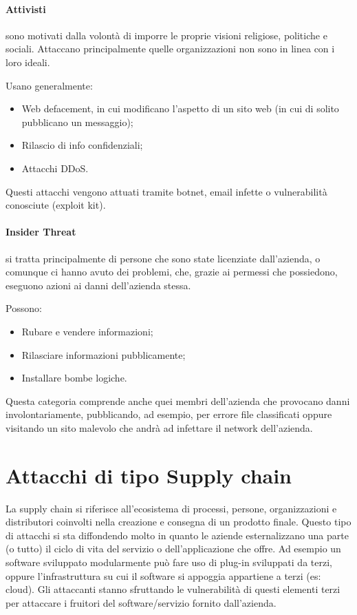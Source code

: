 \paragraph{Attivisti} sono motivati dalla volontà di imporre le proprie visioni religiose, politiche e sociali. Attaccano principalmente quelle organizzazioni non sono in linea con i loro ideali.

\noindent Usano generalmente:
\begin{itemize}
    \item  Web defacement, in cui modificano l'aspetto di un sito web (in cui di solito pubblicano un messaggio);
    \item Rilascio di info confidenziali;
    \item Attacchi DDoS.
\end{itemize}

\noindent Questi attacchi vengono attuati tramite botnet, email infette o vulnerabilità conosciute (exploit kit).
    
\paragraph{Insider Threat} si tratta principalmente di persone che sono state licenziate dall'azienda, o comunque ci hanno avuto dei problemi, che, grazie ai permessi che possiedono, eseguono azioni ai danni dell'azienda stessa. 
    
\noindent Possono:
\begin{itemize}
    \item Rubare e vendere informazioni;
    \item Rilasciare informazioni pubblicamente;
    \item Installare bombe logiche.
\end{itemize}

\noindent Questa categoria comprende anche quei membri dell'azienda che provocano danni involontariamente, pubblicando, ad esempio, per errore file classificati oppure visitando un sito malevolo che andrà ad infettare il network dell'azienda.

\section{Attacchi di tipo Supply chain}

La supply chain si riferisce all'ecosistema di processi, persone, organizzazioni e distributori coinvolti nella creazione e consegna di un prodotto finale. 
Questo tipo di attacchi si sta diffondendo molto in quanto le aziende esternalizzano una parte (o tutto) il ciclo di vita del servizio o dell'applicazione che offre. Ad esempio un software sviluppato modularmente  può fare uso di plug-in sviluppati da terzi, oppure l'infrastruttura su cui il software si appoggia appartiene a terzi (es: cloud).
Gli attaccanti stanno sfruttando le vulnerabilità di questi elementi terzi per attaccare i fruitori del software/servizio fornito dall'azienda.

